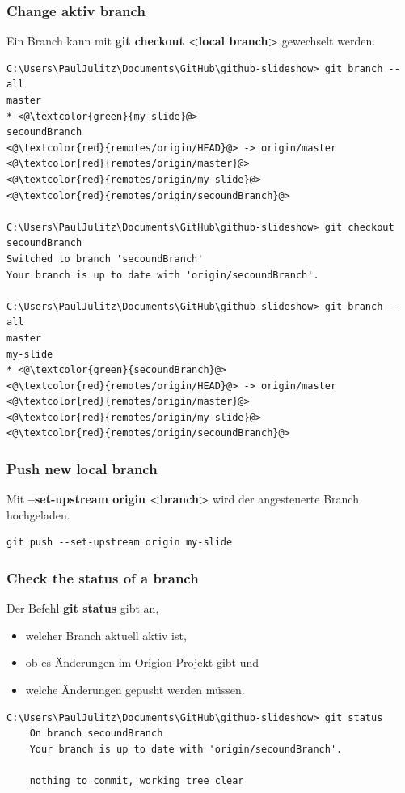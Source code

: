 \subsubsection{Change aktiv branch}
Ein Branch kann mit \textbf{git checkout <local branch>} gewechselt werden.
\begin{lstlisting}[style=CMD]
C:\Users\PaulJulitz\Documents\GitHub\github-slideshow> git branch --all
master
* <@\textcolor{green}{my-slide}@>
secoundBranch
<@\textcolor{red}{remotes/origin/HEAD}@> -> origin/master
<@\textcolor{red}{remotes/origin/master}@>
<@\textcolor{red}{remotes/origin/my-slide}@>
<@\textcolor{red}{remotes/origin/secoundBranch}@>

C:\Users\PaulJulitz\Documents\GitHub\github-slideshow> git checkout secoundBranch
Switched to branch 'secoundBranch'
Your branch is up to date with 'origin/secoundBranch'.

C:\Users\PaulJulitz\Documents\GitHub\github-slideshow> git branch --all
master
my-slide
* <@\textcolor{green}{secoundBranch}@>
<@\textcolor{red}{remotes/origin/HEAD}@> -> origin/master
<@\textcolor{red}{remotes/origin/master}@>
<@\textcolor{red}{remotes/origin/my-slide}@>
<@\textcolor{red}{remotes/origin/secoundBranch}@>
\end{lstlisting}

\subsubsection{Push new local branch}
Mit \textbf{--set-upstream origin <branch>} wird der angesteuerte Branch hochgeladen.
\begin{lstlisting}[style=CMD]
	git push --set-upstream origin my-slide
\end{lstlisting}

\subsubsection{Check the status of a branch}
Der Befehl \textbf{git status} gibt an, 
\begin{itemize}
	\item welcher Branch aktuell aktiv ist, 
	\item ob es Änderungen im Origion Projekt gibt und
	\item welche Änderungen gepusht werden müssen.
\end{itemize}

\begin{lstlisting}[style=CMD]
	C:\Users\PaulJulitz\Documents\GitHub\github-slideshow> git status
	On branch secoundBranch
	Your branch is up to date with 'origin/secoundBranch'.
	
	nothing to commit, working tree clear
\end{lstlisting}

